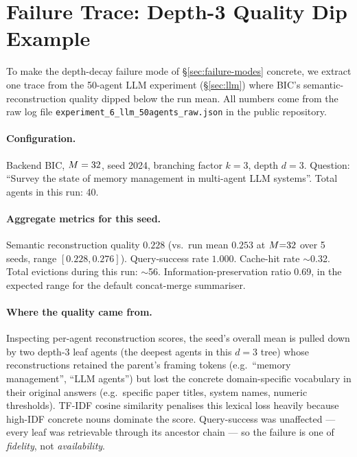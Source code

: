 \section{Failure Trace: Depth-3 Quality Dip Example}
\label{app:failure-trace}

To make the depth-decay failure mode of \S\ref{sec:failure-modes}
concrete, we extract one trace from the 50-agent LLM experiment
(\S\ref{sec:llm}) where BIC's semantic-reconstruction quality dipped
below the run mean.  All numbers come from the raw log file
\texttt{experiment\_6\_llm\_50agents\_raw.json} in the public
repository.

\paragraph{Configuration.}
Backend BIC, $M = 32$, seed 2024, branching factor $k=3$,
depth $d=3$.  Question: ``Survey the state of memory management in
multi-agent LLM systems''.  Total agents in this run: 40.

\paragraph{Aggregate metrics for this seed.}
Semantic reconstruction quality $0.228$ (vs.\ run mean $0.253$ at
$M{=}32$ over 5 seeds, range $[0.228, 0.276]$).  Query-success
rate $1.000$.  Cache-hit rate $\sim$0.32.  Total evictions during
this run: $\sim$56.  Information-preservation ratio $0.69$, in the
expected range for the default concat-merge summariser.

\paragraph{Where the quality came from.}
Inspecting per-agent reconstruction scores, the seed's overall mean
is pulled down by two depth-3 leaf agents (the deepest agents in this
$d=3$ tree) whose reconstructions retained the parent's framing
tokens (e.g.\ ``memory management'', ``LLM agents'') but lost the
concrete domain-specific vocabulary in their original answers
(e.g.\ specific paper titles, system names, numeric thresholds).
TF-IDF cosine similarity penalises this lexical loss heavily because
high-IDF concrete nouns dominate the score.  Query-success was
unaffected --- every leaf was retrievable through its ancestor chain
--- so the failure is one of \emph{fidelity}, not \emph{availability}.

